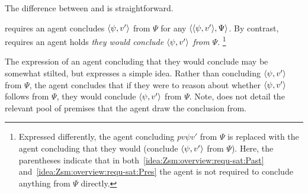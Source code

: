 \begin{note}
  The difference between \iZS{} and \iZSm{} is straightforward.

  \iZS{} requires an agent concludes \(\langle \psi, v' \rangle\) from \(\Psi\) for any \requ{} \(\langle \langle \psi, v' \rangle, \Psi \rangle\).
  By contrast, \iZSm{} requires an agent holds \emph{they would conclude \(\langle \psi, v' \rangle\) from \(\Psi\)}.%
  \footnote{
    Expressed differently, the agent concluding \(pv{\psi}{v'}\) from \(\Psi\) is replaced with the agent concluding that they would (conclude \(\langle \psi, v' \rangle\) from \(\Psi\)).
    Here, the parentheses indicate that in both~\ref{idea:Zsm:overview:requ-sat:Past} and~\ref{idea:Zsm:overview:requ-sat:Pres} the agent is not required to conclude anything from \(\Psi\) directly.
  }

  The expression of an agent concluding that they would conclude may be somewhat stilted, but expresses a simple idea.
  Rather than concluding \(\langle \psi, v' \rangle\) from \(\Psi\), the agent concludes that if they were to reason about whether \(\langle \psi, v' \rangle\) follows from \(\Psi\), they would conclude \(\langle \psi, v' \rangle\) from \(\Psi\).
  Note, \iZSm{} does not detail the relevant pool of premises that the agent draw the conclusion from.
\end{note}

